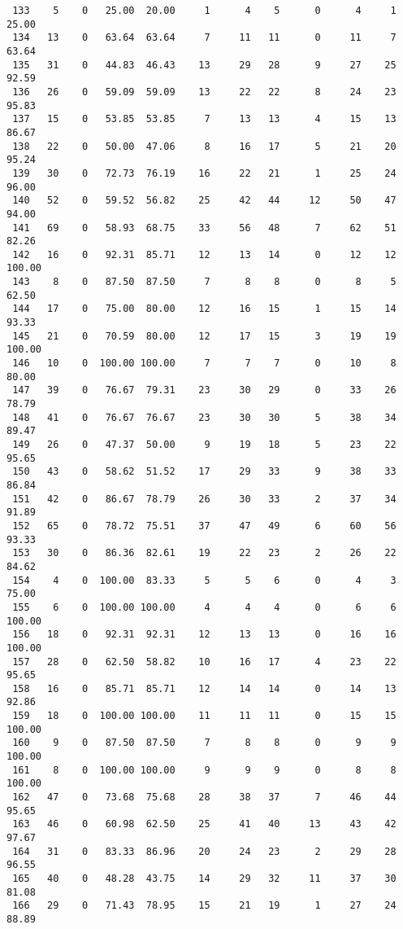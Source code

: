 \begin{verbatim}
 133    5    0   25.00  20.00     1      4    5      0      4     1    25.00
 134   13    0   63.64  63.64     7     11   11      0     11     7    63.64
 135   31    0   44.83  46.43    13     29   28      9     27    25    92.59
 136   26    0   59.09  59.09    13     22   22      8     24    23    95.83
 137   15    0   53.85  53.85     7     13   13      4     15    13    86.67
 138   22    0   50.00  47.06     8     16   17      5     21    20    95.24
 139   30    0   72.73  76.19    16     22   21      1     25    24    96.00
 140   52    0   59.52  56.82    25     42   44     12     50    47    94.00
 141   69    0   58.93  68.75    33     56   48      7     62    51    82.26
 142   16    0   92.31  85.71    12     13   14      0     12    12   100.00
 143    8    0   87.50  87.50     7      8    8      0      8     5    62.50
 144   17    0   75.00  80.00    12     16   15      1     15    14    93.33
 145   21    0   70.59  80.00    12     17   15      3     19    19   100.00
 146   10    0  100.00 100.00     7      7    7      0     10     8    80.00
 147   39    0   76.67  79.31    23     30   29      0     33    26    78.79
 148   41    0   76.67  76.67    23     30   30      5     38    34    89.47
 149   26    0   47.37  50.00     9     19   18      5     23    22    95.65
 150   43    0   58.62  51.52    17     29   33      9     38    33    86.84
 151   42    0   86.67  78.79    26     30   33      2     37    34    91.89
 152   65    0   78.72  75.51    37     47   49      6     60    56    93.33
 153   30    0   86.36  82.61    19     22   23      2     26    22    84.62
 154    4    0  100.00  83.33     5      5    6      0      4     3    75.00
 155    6    0  100.00 100.00     4      4    4      0      6     6   100.00
 156   18    0   92.31  92.31    12     13   13      0     16    16   100.00
 157   28    0   62.50  58.82    10     16   17      4     23    22    95.65
 158   16    0   85.71  85.71    12     14   14      0     14    13    92.86
 159   18    0  100.00 100.00    11     11   11      0     15    15   100.00
 160    9    0   87.50  87.50     7      8    8      0      9     9   100.00
 161    8    0  100.00 100.00     9      9    9      0      8     8   100.00
 162   47    0   73.68  75.68    28     38   37      7     46    44    95.65
 163   46    0   60.98  62.50    25     41   40     13     43    42    97.67
 164   31    0   83.33  86.96    20     24   23      2     29    28    96.55
 165   40    0   48.28  43.75    14     29   32     11     37    30    81.08
 166   29    0   71.43  78.95    15     21   19      1     27    24    88.89

\end{verbatim}
